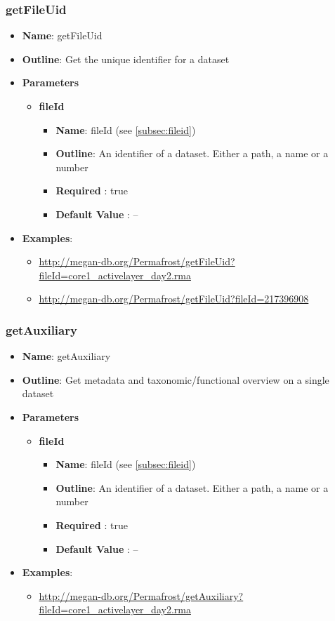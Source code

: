\documentclass[11pt]{article}
\begin{document}
\subsubsection{getFileUid}

\begin{itemize}
	\item \textbf{Name}: getFileUid
	\item \textbf{Outline}: Get the unique identifier for a dataset
	\item \textbf{Parameters}
		\begin{itemize}
			\item \textbf{fileId}		
				\begin{itemize}
					\item \textbf{Name}: fileId (see \ref{subsec:fileid})
					\item \textbf{Outline}: An identifier of a dataset. Either a path, a name or a number
					\item \textbf{Required} : true
					\item \textbf{Default Value} : --
				\end{itemize}
		\end{itemize}
	\item \textbf{Examples}:
		\begin{itemize}		
			\item \url{http://megan-db.org/Permafrost/getFileUid?fileId=core1_activelayer_day2.rma}
			\item \url{http://megan-db.org/Permafrost/getFileUid?fileId=217396908}			
		\end{itemize}
\end{itemize}

\subsubsection{getAuxiliary}

\begin{itemize}
	\item \textbf{Name}: getAuxiliary
	\item \textbf{Outline}: Get metadata and taxonomic/functional overview on a single dataset
	\item \textbf{Parameters}
		\begin{itemize}
			\item \textbf{fileId}
				\begin{itemize}
					\item \textbf{Name}: fileId (see \ref{subsec:fileid})
					\item \textbf{Outline}: An identifier of a dataset. Either a path, a name or a number
					\item \textbf{Required} : true
					\item \textbf{Default Value} : --
				\end{itemize}
		\end{itemize}
	\item \textbf{Examples}:
		\begin{itemize}		
			\item \url{http://megan-db.org/Permafrost/getAuxiliary?fileId=core1_activelayer_day2.rma}
		\end{itemize}
\end{itemize}
\end{document}
